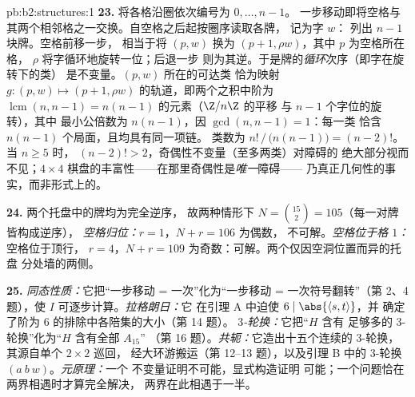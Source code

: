 \begin{solution}{pb:b2:structures:1}
\textbf{23.} 将各格沿圈依次编号为 $0, \dots, n-1$。
一步移动即将空格与其两个相邻格之一交换。自空格之后起按圈序读取各牌，
记为字 $w$：
列出 $n - 1$ 块牌。空格前移一步，
相当于将 $(p, w)$ 换为 $(p + 1, \rho w)$，其中 $p$ 为空格所在格，
$\rho$ 将字循环地旋转一位；后退一步
则为其逆。于是牌的\emph{循环}次序（即字在旋转下的类）
是不变量。$(p, w)$ 所在的可达类
恰为映射 $g \colon (p, w) \mapsto (p+1,
\rho w)$ 的轨道，即两个之积中阶为 $\operatorname{lcm}(n, n-1) =
n(n-1)$ 的元素（$\Z/n\Z$ 的平移
与 $n-1$ 个字位的旋转），其中
最小公倍数为 $n(n-1)$，因 $\gcd(n, n-1) = 1$：每一类
恰含 $n(n-1)$ 个局面，且均具有同一项链。
类数为 $n!\,/\,\bigl(n(n-1)\bigr) = (n-2)!$。当 $n \geq 5$ 时，
$(n-2)! > 2$，奇偶性不变量（至多两类）对障碍的
绝大部分视而不见；$4
\times 4$ 棋盘的丰富性——在那里奇偶性是\emph{唯一}障碍——
乃真正几何性的事实，而非形式上的。

\textbf{24.} 两个托盘中的牌均为完全逆序，
故两种情形下 $N = \binom{15}{2} = 105$（每一对牌皆构成逆序），
\emph{空格归位：}$r = 1$，$N + r = 106$ 为偶数，
不可解。\emph{空格位于格 $1$：}空格位于顶行，
$r = 4$，$N + r = 109$ 为奇数：可解。两个仅因空洞位置而异的托盘
分处墙的两侧。

\textbf{25.} \emph{同态性质：}它把“一步移动 =
一次”化为“一步移动 = 一次符号翻转”（第
2、4 题），使 $I$ 可逐步计算。\emph{拉格朗日：}它
在引理 A 中迫使 $6 \mid \abs{\langle s, t\rangle}$，并
确定了阶为 $6$ 的排除中各陪集的大小（第 14 题）。
\emph{$3$-轮换：}它把“$H$ 含有
足够多的 $3$-轮换”化为“$H$ 含有全部 $A_{15}$”
（第 16 题）。\emph{共轭：}它造出十五个连续的
$3$-轮换，其源自单个 $2 \times 2$ 巡回，
经大环游搬运（第 12--13 题），以及引理 B 中的
$3$-轮换 $(a\ b\ w)$。\emph{元原理：}一个
不变量证明不可能，显式构造证明
可能；一个问题恰在两界相遇时才算完全解决，
两界在此相遇于一半。
\end{solution}
